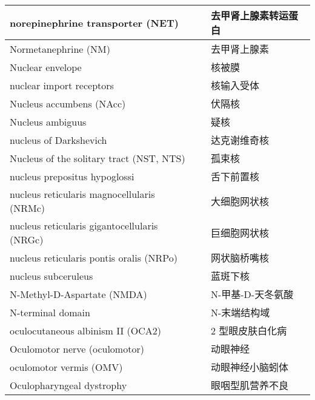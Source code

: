 \begin{longtable}{lll}
	\midrule
	norepinephrine transporter (NET)   && 去甲肾上腺素转运蛋白 \\
	
	\midrule
	Normetanephrine (NM)  && 去甲肾上腺素 \\
	
	\midrule
	Nuclear envelope   && 核被膜  \\
	
	\midrule
	nuclear import receptors   && 核输入受体  \\
	
	\midrule
	Nucleus accumbens (NAcc)  && 伏隔核  \\
	
	\midrule
	Nucleus ambiguus   && 疑核  \\
	
	\midrule
	nucleus of Darkshevich   && 达克谢维奇核  \\
	
	\midrule
	Nucleus of the solitary tract (NST, NTS)  && 孤束核  \\
	
	\midrule
	nucleus prepositus hypoglossi   && 舌下前置核  \\
	
	\midrule
	nucleus reticularis magnocellularis (NRMc)   && 大细胞网状核  \\
	
	\midrule
	nucleus reticularis gigantocellularis (NRGc)   && 巨细胞网状核  \\
	
	\midrule
	nucleus reticularis pontis oralis (NRPo)   && 网状脑桥嘴核  \\
	
	\midrule
	nucleus subceruleus   && 蓝斑下核  \\
	
	\midrule
	N-Methyl-D-Aspartate (NMDA)   && N-甲基-D-天冬氨酸  \\
	
	\midrule
	N-terminal domain   && N-末端结构域  \\
	
	\midrule
	oculocutaneous albinism II (OCA2)     && 2 型眼皮肤白化病   \\
	
	\midrule
	Oculomotor nerve (oculomotor)     && 动眼神经   \\
	
	\midrule
	oculomotor vermis (OMV)     && 动眼神经小脑蚓体   \\
	
	\midrule
	Oculopharyngeal dystrophy     && 眼咽型肌营养不良   \\
	

\end{longtable}
